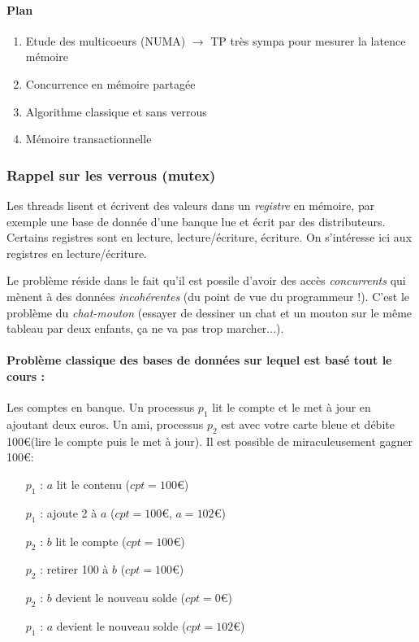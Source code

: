 \documentclass{article}
\begin{document}
\paragraph{Plan}
\begin{enumerate}[I]
\item Etude des multicoeurs (NUMA) $\to$ TP très sympa pour mesurer la latence mémoire
\item Concurrence en mémoire partagée
\item Algorithme classique et sans verrous
\item Mémoire transactionnelle
\end{enumerate}


\subsubsection*{Rappel sur les verrous (mutex)}
Les threads lisent et écrivent des valeurs dans un \emph{registre} en mémoire, par exemple une base de donnée d'une banque lue et écrit par des distributeurs. Certains registres sont en lecture, lecture/écriture, écriture. On s'intéresse ici aux registres en lecture/écriture.

Le problème réside dans le fait qu'il est possile d'avoir des accès \emph{concurrents} qui mènent à des données \emph{incohérentes} (du point de vue du programmeur !). C'est le problème du \emph{chat-mouton} (essayer de dessiner un chat et un mouton sur le même tableau par deux enfants, ça ne va pas trop marcher...).

\paragraph{Problème classique des bases de données sur lequel est basé tout le cours :} Les comptes en banque. Un processus $p_1$ lit le compte et le met à jour en ajoutant deux euros. Un ami, processus $p_2$ est avec votre carte bleue et débite 100\euro (lire le compte puis le met à jour). Il est possible de miraculeusement gagner 100\euro : 
\begin{itemize}
\item[$p_1$ :] $a$ lit le contenu ($cpt=100$\euro)
\item[$p_1$ :] ajoute 2 à $a$ ($cpt=100$\euro, $a=102$\euro)
\item[$p_2$ :] $b$ lit le compte ($cpt=100$\euro)
\item[$p_2$ :] retirer 100 à $b$ ($cpt=100$\euro)
\item[$p_2$ :] $b$ devient le nouveau solde ($cpt=0$\euro)
\item[$p_1$ :] $a$ devient le nouveau solde ($cpt=102$\euro)
\end{itemize}
\bigskip
\end{document}
